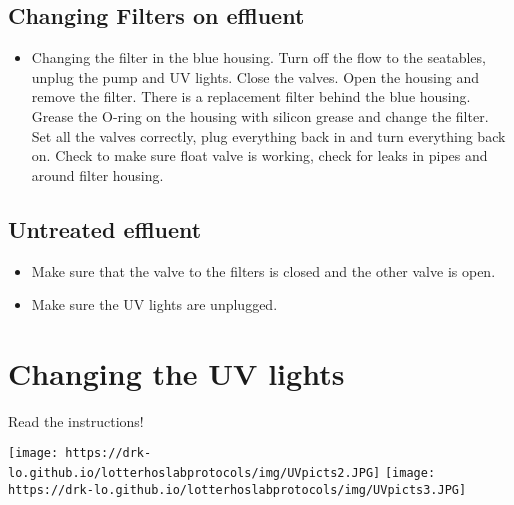 \documentclass[
  letterpaper,
  DIV=11,
  numbers=noendperiod]{scrreprt}
\providecommand{\tightlist}{%
  \setlength{\itemsep}{0pt}\setlength{\parskip}{0pt}}\usepackage{longtable,booktabs,array}
\begin{document}
\hypertarget{changing-filters-on-effluent}{%
\subsection*{\texorpdfstring{\textbf{Changing Filters on
effluent}}{Changing Filters on effluent}}\label{changing-filters-on-effluent}}

\begin{itemize}
\tightlist
\item
  Changing the filter in the blue housing. Turn off the flow to the
  seatables, unplug the pump and UV lights. Close the valves. Open the
  housing and remove the filter. There is a replacement filter behind
  the blue housing. Grease the O-ring on the housing with silicon grease
  and change the filter. Set all the valves correctly, plug everything
  back in and turn everything back on. Check to make sure float valve is
  working, check for leaks in pipes and around filter housing.
\end{itemize}

\hypertarget{untreated-effluent}{%
\subsection*{\texorpdfstring{\textbf{Untreated
effluent}}{Untreated effluent}}\label{untreated-effluent}}

\begin{itemize}
\item
  Make sure that the valve to the filters is closed and the other valve
  is open.
\item
  Make sure the UV lights are unplugged.
\end{itemize}

\hypertarget{changing-the-uv-lights}{%
\section*{\texorpdfstring{\textbf{Changing the UV
lights}}{Changing the UV lights}}\label{changing-the-uv-lights}}

Read the instructions!

\texttt{[image: https://drk-lo.github.io/lotterhoslabprotocols/img/UVpicts2.JPG]}
\texttt{[image: https://drk-lo.github.io/lotterhoslabprotocols/img/UVpicts3.JPG]}
\end{document}
